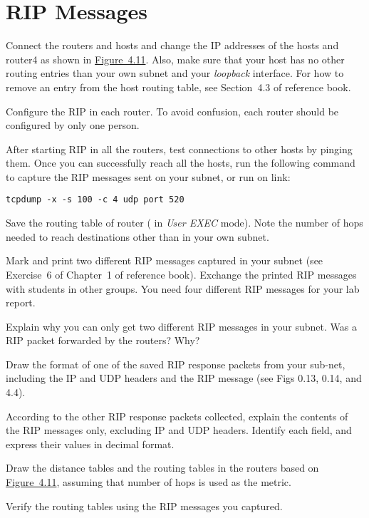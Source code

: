 \documentclass{../UTNetLab}
\begin{document}
\section{RIP Messages}
Connect the routers and hosts and change the IP addresses of the hosts and router4 as shown in \hyperref[fig:4.11]{Figure~4.11}.
Also, make sure that your host has no other routing entries than your own subnet and your \textit{loopback} interface.
For how to remove an entry from the host routing table, see Section~4.3 of reference book.

Configure the RIP in each router.
To avoid confusion, each router should be configured by only one person.

After starting RIP in all the routers, test connections to other hosts by pinging them.
Once you can successfully reach all the hosts, run the following command to capture the RIP messages sent on your subnet, or run  on link:
\begin{lstlisting}[morekeywords={[3]udp,port}]
tcpdump -x -s 100 -c 4 udp port 520
    \end{lstlisting}

Save the routing table of router ( in \textit{User EXEC} mode).
Note the number of hops needed to reach destinations other than in your own subnet.

Mark and print two different RIP messages captured in your subnet (see Exercise~6 of Chapter~1 of reference book).
Exchange the printed RIP messages with students in other groups.
You need four different RIP messages for your lab report.

\begin{report}
    \item Explain why you can only get two different RIP messages in your subnet.
    Was a RIP packet forwarded by the routers?
    Why?

    \item Draw the format of one of the saved RIP response packets from your sub-net, including the IP and UDP headers and the RIP message (see Figs 0.13, 0.14, and 4.4).

    \item According to the other RIP response packets collected, explain the contents of the RIP messages only, excluding IP and UDP headers.
    Identify each field, and express their values in decimal format.


    \item Draw the distance tables and the routing tables in the routers based on \hyperref[fig:4.11]{Figure~4.11}, assuming that number of hops is used as the metric.

    \item Verify the routing tables using the RIP messages you captured.
\end{report}
\end{document}
